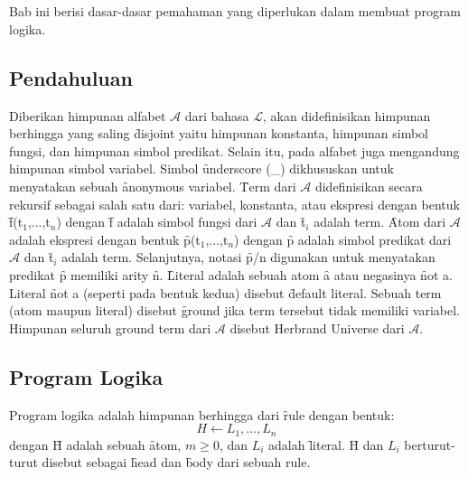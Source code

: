 \chapter{\babDua}
\label{bab2}
Bab ini berisi dasar-dasar pemahaman yang diperlukan dalam membuat program logika. 
\section{Pendahuluan}
Diberikan himpunan alfabet \( \mathcal{A} \) dari bahasa \( \mathcal{L} \), akan didefinisikan himpunan berhingga yang saling \f{disjoint} yaitu himpunan konstanta, himpunan simbol fungsi, dan himpunan simbol predikat. Selain itu, pada alfabet juga mengandung himpunan simbol variabel. Simbol \f{underscore} (\_) dikhususkan untuk menyatakan sebuah \f{anonymous} variabel. \f{Term} dari \( \mathcal{A} \) didefinisikan secara rekursif sebagai salah satu dari: variabel, konstanta, atau ekspresi dengan bentuk \f{f(t$_{1}$,...,t$_{n}$)} dengan \f{f} adalah simbol fungsi dari \( \mathcal{A} \) dan \f{t$_{i}$} adalah term. \f{Atom} dari \( \mathcal{A} \) adalah ekspresi dengan bentuk \f{p(t$_{1}$,...,t$_{n}$)} dengan \f{p} adalah simbol predikat dari \( \mathcal{A} \) dan \f{t$_{i}$} adalah term. Selanjutnya, notasi \f{p/n} digunakan untuk menyatakan predikat \f{p} memiliki arity \f{n}. \f{Literal} adalah sebuah atom \f{a} atau negasinya \f{not a}. Literal \f{not a} (seperti pada bentuk kedua) disebut \f{default} literal. Sebuah term (atom maupun literal) disebut \f{ground} jika term tersebut tidak memiliki variabel. Himpunan seluruh ground term dari \( \mathcal{A} \) disebut Herbrand Universe dari \( \mathcal{A} \).
\section{Program Logika}\label{cha:kompar}
Program logika adalah himpunan berhingga dari \f{rule} dengan bentuk:
\begin{displaymath}
	H \leftarrow L_1,...,L_n
\end{displaymath}
dengan \f{H} adalah sebuah \f{atom}, $m \geq 0$, dan $L_i$ adalah \f{literal}. \f{H} dan $L_i$ berturut-turut disebut sebagai \f{head} dan \f{body} dari sebuah rule.

